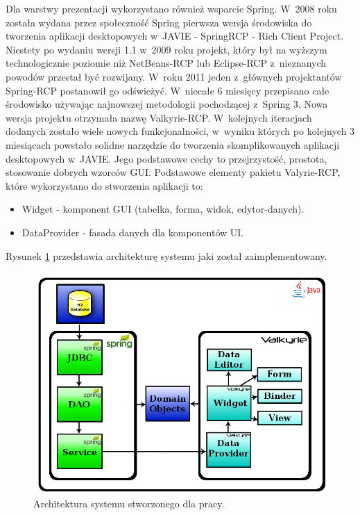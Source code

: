 Dla warstwy prezentacji wykorzystano również wsparcie Spring. W~2008 roku została wydana przez społeczność Spring pierwsza wersja środowiska do tworzenia aplikacji desktopowych w~JAVIE - SpringRCP - Rich Client Project. Niestety po wydaniu wersji 1.1 w~2009 roku projekt, który był na wyższym technologicznie poziomie niż NetBeans-RCP lub Eclipse-RCP z~nieznanych powodów przestał być rozwijany\cite{spring_rcp_reference}. W~roku 2011 jeden z~głównych projektantów Spring-RCP postanowił go odświeżyć. W~niecałe 6 miesięcy przepisano całe środowisko używając najnowszej metodologii pochodzącej z~Spring 3. Nowa wersja projektu otrzymała nazwę Valkyrie-RCP\cite{valkyrie_reference}. W~kolejnych iteracjach dodanych zostało wiele nowych funkcjonalności, w~wyniku których po kolejnych 3 miesiącach powstało solidne narzędzie do tworzenia skomplikowanych aplikacji desktopowych w~JAVIE. Jego podstawowe cechy to przejrzystość, prostota, stosowanie dobrych wzorców GUI.
Podstawowe elementy pakietu Valyrie-RCP, które wykorzystano do stworzenia aplikacji to\cite{valkyrie_reference}:
\begin{itemize}
 \item Widget - komponent GUI (tabelka, forma, widok, edytor-danych).
 \item DataProvider - fasada danych dla komponentów UI.
\end{itemize}

Rysunek \ref{img:rysunek_spring2} przedstawia architekturę systemu jaki został zaimplementowany.

\begin{figure}[!ht]
\centering
\includegraphics[scale=0.4]{images/spring-layers2}
\caption[Rysunek przedstawiający model architektury systemu]{Architektura systemu stworzonego dla pracy.}
\label{img:rysunek_spring2}
\end{figure}

